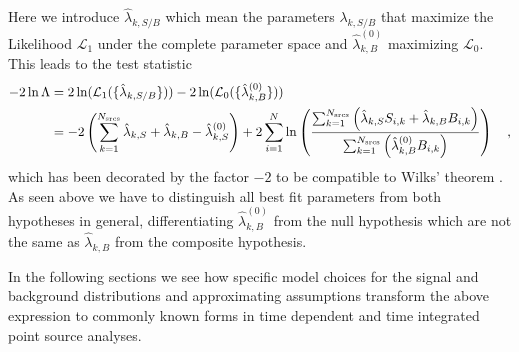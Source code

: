 Here we introduce $\hat{\lambda}_{k,S/B}$ which mean the parameters $\lambda_{k,S/B}$ that maximize the Likelihood $\mathcal{L}_1$ under the complete parameter space and $\hat{\lambda}_{k,B}^{(0)}$ maximizing $\mathcal{L}_0$.
This leads to the test statistic
\begin{equation}
  \begin{aligned}
    -2\ln\Lambda
    &= 2\ln(\mathcal{L}_1(\{\hat{\lambda}_{k,S/B}\})) -
       2\ln(\mathcal{L}_0(\{\hat{\lambda}^{(0)}_{k,B}\})) \\
    &= -2\left(\sum_{k=1}^{N_\text{srcs}}\hat{\lambda}_{k,S} +
                                         \hat{\lambda}_{k,B} -
                                         \hat{\lambda}_{k,S}^{(0)}\right) +
      2\sum_{i=1}^N \ln\left(
        \frac{\sum_{k=1}^{N_\text{srcs}}\left(
            \hat{\lambda}_{k,S} S_{i,k}+\hat{\lambda}_{k,B} B_{i,k}\right)}
            {\sum_{k=1}^{N_\text{srcs}}\left(
              \hat{\lambda}_{k,B}^{(0)} B_{i,k}
            \right)}
          \right)
    \quad\text{,}
  \end{aligned}
\end{equation}
which has been decorated by the factor $-2$ to be compatible to Wilks' theorem .
As seen above we have to distinguish all best fit parameters from both hypotheses in general, differentiating $\hat{\lambda}_{k,B}^{(0)}$ from the null hypothesis which are not the same as $\hat{\lambda}_{k,B}$ from the composite hypothesis.

In the following sections we see how specific model choices for the signal and background distributions and approximating assumptions transform the above expression to commonly known forms in time dependent and time integrated point source analyses.


